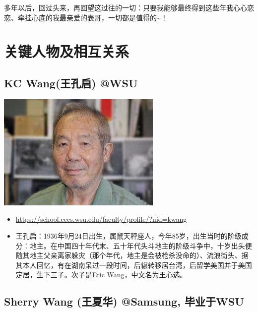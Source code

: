\documentclass[9pt, b5paper]{article}
\begin{document}
多年以后，回过头来，再回望这过往的一切：只要我能够最终得到这些年我心心恋恋、牵挂心底的我最亲爱的表哥，一切都是值得的\textasciitilde{}！


\section{关键人物及相互关系}
\label{sec:org5cc1bea}
\subsection{KC Wang(王孔启) @WSU}
\label{sec:org28e4cdf}

\begin{center}
\includegraphics[width=.9\linewidth]{./pic/KCWang.jpg}
\end{center}
\begin{itemize}
\item \url{https://school.eecs.wsu.edu/faculty/profile/?nid=kwang}
\item 王孔启：1936年9月24日出生，属鼠天秤座人，今年85岁，出生当时的阶级成分：地主。在中国四十年代末、五十年代头斗地主的阶级斗争中，十岁出头便随其地主父亲离家躲灾（那个年代，地主是会被枪杀没命的）、流浪街头、据其本人回忆，有在湖南呆过一段时间，后辗转移居台湾，后留学美国并于美国定居，生下三子。次子是Eric Wang，中文名为王心选。
\end{itemize}
\subsection{Sherry Wang (王夏华) @Samsung, 毕业于WSU}
\label{sec:org79c5d92}
\end{document}

